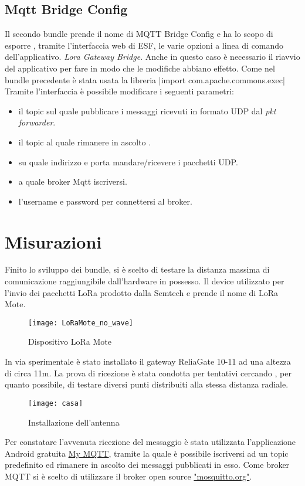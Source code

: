 \subsection{Mqtt Bridge Config}
Il secondo bundle prende il nome di MQTT Bridge Config e ha lo scopo 
di esporre , tramite l'interfaccia web di ESF, le varie opzioni a linea di
comando dell'applicativo.
 \emph{Lora Gateway Bridge}.  Anche in questo caso è necessario il
riavvio del applicativo per fare in modo che le modifiche abbiano effetto. 
Come nel bundle precedente è stata usata la libreria
|import com.apache.commons.exec|
Tramite l'interfaccia è possibile modificare i seguenti parametri:
\begin{itemize}
\item il topic sul quale pubblicare i messaggi ricevuti in formato UDP dal
\emph{pkt forwarder}.
\item il topic al quale rimanere in ascolto .
\item su quale indirizzo e porta mandare/ricevere i pacchetti UDP.
\item a quale broker Mqtt iscriversi.
\item l'username e password per connettersi al broker.
\end{itemize}


\section{Misurazioni}
Finito lo sviluppo dei bundle, si è scelto di testare la distanza massima
di comunicazione raggiungibile dall'hardware in possesso. 
Il device utilizzato per l'invio dei pacchetti LoRa prodotto dalla Semtech e
prende il nome di LoRa Mote.
\begin{figure}[h]
        \centering 
                \texttt{[image: LoRaMote\_no\_wave]}
        \caption{Dispositivo LoRa Mote}
        \label{fig:Software_stack}
\end{figure}
In via sperimentale è stato installato  il gateway
ReliaGate 10-11 ad una altezza di circa 11m. La prova di ricezione è stata condotta per
tentativi cercando , per quanto possibile, di testare diversi punti distribuiti
alla stessa distanza radiale. 
\begin{figure}[h]
        \centering 
                \texttt{[image: casa]}
        \caption{Installazione dell'antenna}
        \label{fig:Software_stack}
\end{figure}
Per constatare l'avvenuta ricezione del
messaggio è stata utilizzata l'applicazione Android gratuita \href{
https://play.google.com/store/apps/details?id=at.tripwire.mqtt.client&hl=en}{My
MQTT}, tramite la
quale è possibile iscriversi ad un topic predefinito ed rimanere in ascolto dei
messaggi pubblicati in esso. 
Come broker MQTT si è scelto di utilizzare il
broker open source \href{http://mosquitto.org/}{"mosquitto.org"}. 
